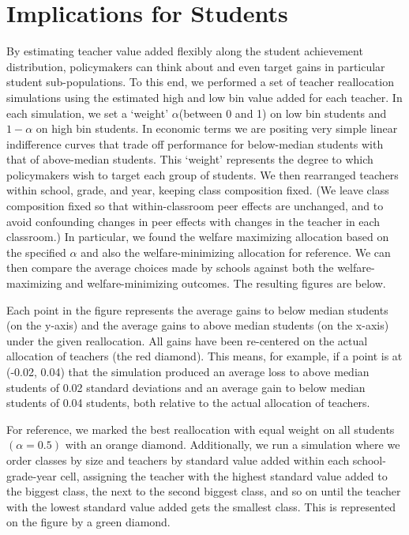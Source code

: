 \documentclass{article}
\theoremstyle{definition}
\theoremstyle{definition}
\theoremstyle{definition}
\theoremstyle{definition}
\begin{document}

\section{Implications for Students} \label{swell}

By estimating teacher value added flexibly along the student achievement distribution, policymakers can think about and even target gains in particular student sub-populations. To this end, we performed a set of teacher reallocation simulations using the estimated high and low bin value added for each teacher. In each simulation, we set a ‘weight’ $\alpha$(between 0 and 1) on low bin students and $1 - \alpha$ on high bin students. In economic terms we are positing very simple linear indifference curves that trade off performance for below-median students with that of above-median students. This ‘weight’ represents the degree to which policymakers wish to target each group of students. We then rearranged teachers within school, grade, and year, keeping class composition fixed. (We leave class composition fixed so that within-classroom peer effects are unchanged, and to avoid confounding changes in peer effects with changes in the teacher in each classroom.) In particular, we found the welfare maximizing allocation based on the specified $\alpha$ and also the welfare-minimizing allocation for reference. We can then compare the average choices made by schools against both the welfare-maximizing and welfare-minimizing outcomes. The resulting figures are below.

	Each point in the figure represents the average gains to below median students (on the y-axis) and the average gains to above median students (on the x-axis) under the given reallocation. All gains have been re-centered on the actual allocation of teachers (the red diamond). This means, for example, if a point is at (-0.02, 0.04) that the simulation produced an average loss to above median students of 0.02 standard deviations and an average gain to below median students of 0.04 students, both relative to the actual allocation of teachers.

	For reference, we marked the best reallocation with equal weight on all students $(\alpha=0.5)$ with an orange diamond. Additionally, we run a simulation where we order classes by size and teachers by standard value added within each school-grade-year cell, assigning the teacher with the highest standard value added to the biggest class, the next to the second biggest class, and so on until the teacher with the lowest standard value added gets the smallest class. This is represented on the figure by a green diamond.
\end{document}
